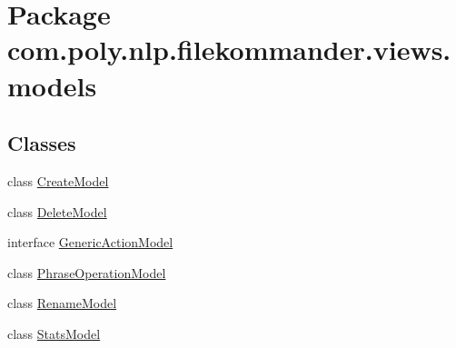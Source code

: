 \hypertarget{namespacecom_1_1poly_1_1nlp_1_1filekommander_1_1views_1_1models}{\section{Package com.\-poly.\-nlp.\-filekommander.\-views.\-models}
\label{namespacecom_1_1poly_1_1nlp_1_1filekommander_1_1views_1_1models}
}
\subsection*{Classes}
\begin{DoxyCompactItemize}
\item 
class \hyperlink{classcom_1_1poly_1_1nlp_1_1filekommander_1_1views_1_1models_1_1_create_model}{Create\-Model}
\item 
class \hyperlink{classcom_1_1poly_1_1nlp_1_1filekommander_1_1views_1_1models_1_1_delete_model}{Delete\-Model}
\item 
interface \hyperlink{interfacecom_1_1poly_1_1nlp_1_1filekommander_1_1views_1_1models_1_1_generic_action_model}{Generic\-Action\-Model}
\item 
class \hyperlink{classcom_1_1poly_1_1nlp_1_1filekommander_1_1views_1_1models_1_1_phrase_operation_model}{Phrase\-Operation\-Model}
\item 
class \hyperlink{classcom_1_1poly_1_1nlp_1_1filekommander_1_1views_1_1models_1_1_rename_model}{Rename\-Model}
\item 
class \hyperlink{classcom_1_1poly_1_1nlp_1_1filekommander_1_1views_1_1models_1_1_stats_model}{Stats\-Model}
\end{DoxyCompactItemize}
